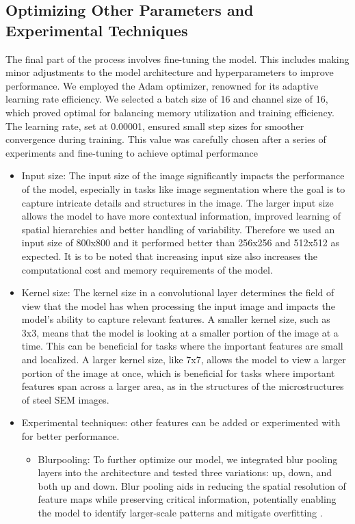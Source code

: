 \documentclass[]{article}
\begin{document}
\subsection{Optimizing Other Parameters and Experimental Techniques}
The final part of the process involves fine-tuning the model. This includes making minor adjustments to the model architecture and hyperparameters to improve performance. We employed the Adam optimizer, renowned for its adaptive learning rate efficiency. We selected a batch size of 16 and channel size of 16, which proved optimal for balancing memory utilization and training efficiency. The learning rate, set at 0.00001, ensured small step sizes for smoother convergence during training. This value was carefully chosen after a series of experiments and fine-tuning to achieve optimal performance
\begin{itemize}
	\item Input size: The input size of the image significantly impacts the performance of the model, especially in tasks like image segmentation where the goal is to capture intricate details and structures in the image. The larger input size allows the model to have more contextual information, improved learning of spatial hierarchies and better handling of variability. Therefore we used an input size of 800x800 and it performed better than 256x256 and 512x512 as expected. It is to be noted that increasing input size also increases the computational cost and memory requirements of the model.
	\item Kernel size: The kernel size in a convolutional layer determines the field of view that the model has when processing the input image and impacts the model's ability to capture relevant features. A smaller kernel size, such as 3x3, means that the model is looking at a smaller portion of the image at a time. This can be beneficial for tasks where the important features are small and localized. A larger kernel size, like 7x7, allows the model to view a larger portion of the image at once, which is beneficial for tasks where important features span across a larger area, as in the structures of the microstructures of steel SEM images. 
	\item Experimental techniques: other features can be added or experimented with for better performance.
	\begin{itemize}
		\item Blurpooling: To further optimize our model, we integrated blur pooling layers into the architecture and tested three variations: up, down, and both up and down. Blur pooling aids in reducing the spatial resolution of feature maps while preserving critical information, potentially enabling the model to identify larger-scale patterns and mitigate overfitting \cite{blurPooling}.

\end{itemize}
\end{itemize}
\end{document}
